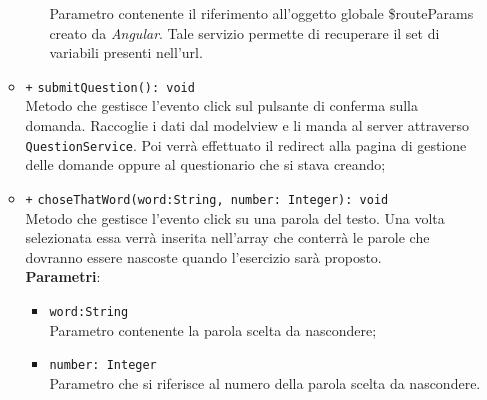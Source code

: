 \begin{itemize}
\begin{itemize}
\begin{itemize}
			Parametro contenente il riferimento all'oggetto globale \$routeParams creato da \textit{Angular}. Tale servizio permette di recuperare il set di variabili presenti nell'url. 
		\end{itemize}
		\item \texttt{+} \texttt{submitQuestion(): void}\\ 
		Metodo che gestisce l’evento click sul pulsante di conferma sulla domanda. Raccoglie i dati dal modelview e li manda al server attraverso \texttt{QuestionService}. Poi verrà effettuato il redirect alla pagina di gestione delle domande oppure al questionario che si stava creando; 
		\item \texttt{+} \texttt{choseThatWord(word:String, number: Integer): void}\\
		Metodo che gestisce l’evento click su una parola del testo. Una volta selezionata essa verrà inserita nell'array che conterrà le parole che dovranno essere nascoste quando l'esercizio sarà proposto. \\
		\textbf{Parametri}:
		\begin{itemize}
			\item \texttt{word:String} \\
			Parametro contenente la parola scelta da nascondere;
			\item \texttt{number: Integer} \\ 
			Parametro che si riferisce al numero della parola scelta da nascondere.
		\end{itemize}
	\end{itemize}
\end{itemize}

